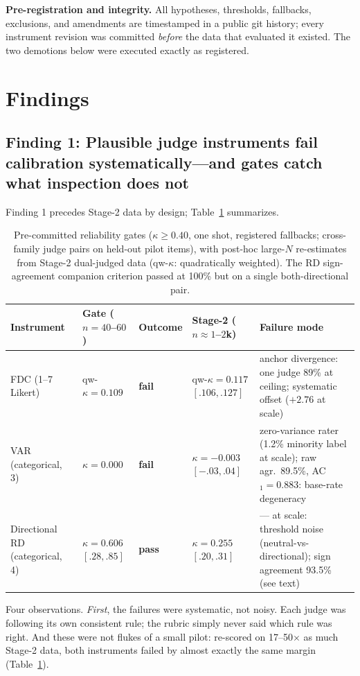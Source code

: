 \documentclass{article}
\newcommand{\kap}{\kappa}
\begin{document}
\textbf{Pre-registration and integrity.} All hypotheses, thresholds,
fallbacks, exclusions, and amendments are timestamped in a public git
history; every instrument revision was committed \emph{before} the data
that evaluated it existed. The two demotions below were executed exactly
as registered.

\section{Findings}

\subsection{Finding 1: Plausible judge instruments fail calibration systematically---and gates catch what inspection does not}
\label{sec:gates}

Finding 1 precedes Stage-2 data by design; Table~\ref{tab:gates}
summarizes.

\begin{table}[h]
\centering
\small
\begin{tabular}{llllp{4.6cm}}
\toprule
Instrument & Gate ($n{=}40$--$60$) & Outcome &
Stage-2 ($n{\approx}1$--$2$k) & Failure mode \\
\midrule
FDC (1--7 Likert) & qw-$\kap = 0.109$ & \textbf{fail} &
qw-$\kap = 0.117$ $[.106,.127]$ & anchor divergence: one judge 89\% at
ceiling; systematic offset ($+2.76$ at scale) \\
VAR (categorical, 3) & $\kap = 0.000$ & \textbf{fail} &
$\kap = -0.003$ $[-.03,.04]$ & zero-variance rater (1.2\% minority label
at scale); raw agr.\ 89.5\%, AC$_1{=}0.883$: base-rate degeneracy \\
Directional RD (categorical, 4) & $\kap = 0.606$ $[.28,.85]$ & \textbf{pass} &
$\kap = 0.255$ $[.20,.31]$ & --- at scale: threshold noise
(neutral-vs-directional); sign agreement 93.5\% (see text) \\
\bottomrule
\end{tabular}
\caption{Pre-committed reliability gates ($\kap \ge 0.40$, one shot,
registered fallbacks; cross-family judge pairs on held-out pilot items),
with post-hoc large-$N$ re-estimates from Stage-2 dual-judged data
(qw-$\kap$: quadratically weighted). The
RD sign-agreement companion criterion passed at 100\% but on a single
both-directional pair.}
\label{tab:gates}
\end{table}

Four observations. \emph{First}, the failures were systematic, not
noisy. Each judge was following its own consistent rule; the rubric
simply never said which rule was right. And these were not flukes of a
small pilot: re-scored on 17--50$\times$ as much Stage-2 data, both
instruments failed by almost exactly the same margin
(Table~\ref{tab:gates}).
\end{document}
